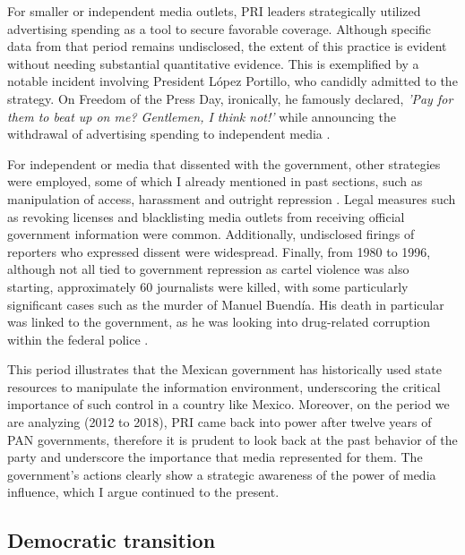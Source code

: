 For smaller or independent media outlets, PRI leaders strategically utilized advertising spending as a tool to secure favorable coverage. Although specific data from that period remains undisclosed, the extent of this practice is evident without needing substantial quantitative evidence. This is exemplified by a notable incident involving President López Portillo, who candidly admitted to the strategy. On Freedom of the Press Day, ironically, he famously declared, \textit{'Pay for them to beat up on me? Gentlemen, I think not!'} while announcing the withdrawal of advertising spending to independent media \citep{PrensaVendida-Rod}.  

For independent or media that dissented with the government, other strategies were employed, some of which I already mentioned in past sections, such as manipulation of access, harassment and outright repression \citep{FourthState-Lawson-Book}. Legal measures such as revoking licenses and blacklisting media outlets from receiving official government information were common. Additionally, undisclosed firings of reporters who expressed dissent were widespread. Finally, from 1980 to 1996, although not all tied to government repression as cartel violence was also starting, approximately 60 journalists were killed, with some particularly significant cases such as the murder of Manuel Buendía. His death in particular was linked to the government, as he was looking into drug-related corruption within the federal police \citep{FourthState-Lawson-Book}. 

This period illustrates that the Mexican government has historically used state resources to manipulate the information environment, underscoring the critical importance of such control in a country like Mexico. Moreover, on the period we are analyzing (2012 to 2018), PRI came back into power after twelve years of PAN governments, therefore it is prudent to look back at the past behavior of the party and underscore the importance that media represented for them. The government's actions clearly show a strategic awareness of the power of media influence, which I argue continued to the present.

\subsection{Democratic transition}

